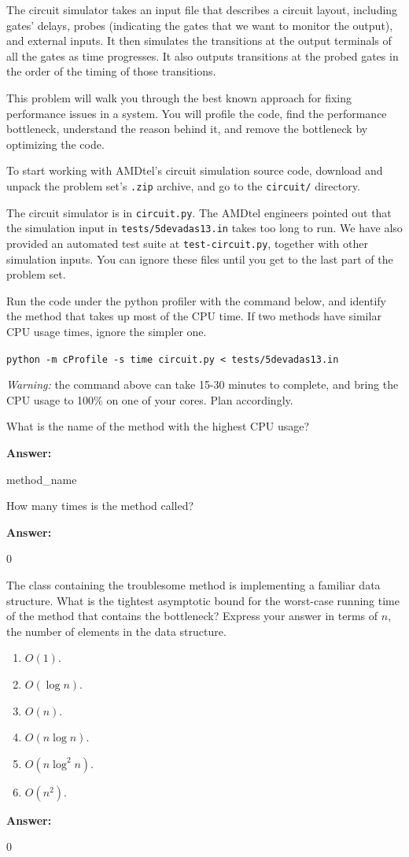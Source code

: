 \documentclass[12pt,twoside]{article}
\newcommand{\answer}{
 \par\medskip
 \textbf{Answer:}
}
\newcommand{\answerIIa}{ \answer 
method\_name
}
\newcommand{\answerIIb}{ \answer
0
}
\newcommand{\answerIIc}{ \answer
0
}
\begin{document}
\begin{problems}
The circuit simulator takes an input file that describes a circuit layout,
including gates' delays, probes (indicating the gates that we want to
monitor the output), and external inputs. It then simulates the transitions at
the output terminals of all the gates as time progresses. It also outputs
transitions at the probed gates in the order of the timing of those
transitions.

This problem will walk you through the best known approach for fixing
performance issues in a system. You will profile the code, find the performance
bottleneck, understand the reason behind it, and remove the bottleneck by
optimizing the code.

To start working with AMDtel's circuit simulation source code, download and
unpack the problem set's \texttt{.zip} archive, and go to the \texttt{circuit/}
directory.

The circuit simulator is in \texttt{circuit.py}. The AMDtel engineers pointed
out that the simulation input in \texttt{tests/5devadas13.in} takes too long
to run. We have also provided an automated test suite at
\texttt{test-circuit.py}, together with other simulation inputs. You can ignore
these files until you get to the last part of the problem set.

\begin{problemparts}

\problempart {} Run the code under the python profiler with the command
below, and identify the method that takes up most of the CPU time. If two
methods have similar CPU usage times, ignore the simpler one.

\texttt{python -m cProfile -s time circuit.py < tests/5devadas13.in}

\textit{Warning:} the command above can take 15-30 minutes to complete, and
bring the CPU usage to 100\% on one of your cores. Plan accordingly.

What is the name of the method with the highest CPU usage?
\answerIIa


\problempart {} How many times is the method called?
\answerIIb

\problempart {} The class containing the troublesome method is
implementing a familiar data structure. What is the tightest asymptotic bound
for the worst-case running time of the method that contains the bottleneck?
Express your answer in terms of $n$, the number of elements in the data
structure.
\begin{enumerate}
  \item $O(1)$.
  \item $O(\log n)$.
  \item $O(n)$.
  \item $O(n \log n)$.
  \item $O(n \log^2 n)$.
  \item $O(n^2)$.
\end{enumerate}
\answerIIc 


\end{problemparts}
\end{problems}
\end{document}
